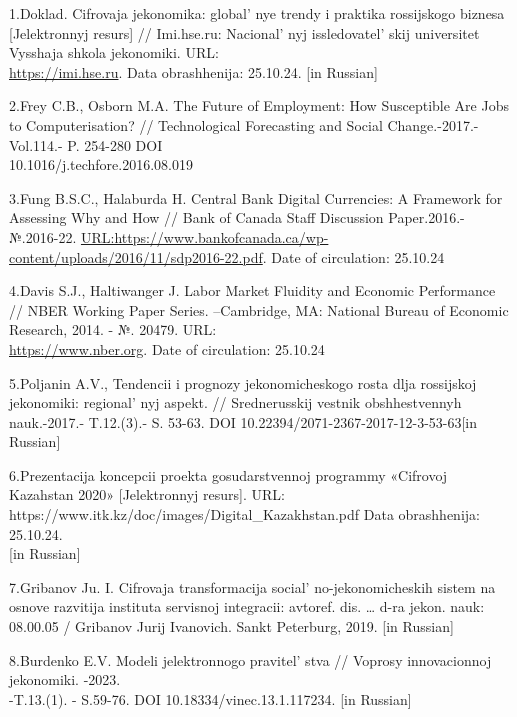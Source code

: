 \begin{references}
1.Doklad. Cifrovaja jekonomika: global' nye trendy i
praktika rossijskogo biznesa {[}Jelektronnyj resurs{]} // Imi.hse.ru:
Nacional' nyj issledovatel' skij
universitet Vysshaja shkola jekonomiki. URL:\\
\href{https://imi.hse.ru/pr2017\_1}{https://imi.hse.ru}. Data obrashhenija: 25.10.24. {[}in
Russian{]}

2.Frey C.B., Osborn M.A. The Future of Employment: How Susceptible Are
Jobs to Computerisation? // Technological Forecasting and Social
Change.-2017.-Vol.114.- P. 254-280 DOI \\10.1016/j.techfore.2016.08.019

3.Fung B.S.C., Halaburda H. Central Bank Digital Currencies: A Framework
for Assessing Why and How // Bank of Canada Staff Discussion
Paper.2016.-№.2016-22.
\href{https://www.bankofcanada.ca/wp-content/uploads/2016/11/sdp2016-22.pdf}{URL:https://www.bankofcanada.ca/wp-content/uploads/2016/11/sdp2016-22.pdf}.
Date of circulation: 25.10.24

4.Davis S.J., Haltiwanger J. Labor Market Fluidity and Economic
Performance // NBER Working Paper Series. --Cambridge, MA: National
Bureau of Economic Research, 2014. - №. 20479. URL:\\
\href{https://www.nber.org/system/files/working\_papers/w20479/w20479.pdf}{https://www.nber.org}.
Date of circulation: 25.10.24

5.Poljanin A.V., Tendencii i prognozy jekonomicheskogo rosta dlja
rossijskoj jekonomiki: regional' nyj aspekt. //
Srednerusskij vestnik obshhestvennyh nauk.-2017.- T.12.(3).- S. 53-63.
DOI 10.22394/2071-2367-2017-12-3-53-63{[}in Russian{]}

6.Prezentacija koncepcii proekta gosudarstvennoj programmy «Cifrovoj
Kazahstan 2020» {[}Jelektronnyj resurs{]}. URL:
https://www.itk.kz/doc/images/Digital\_Kazakhstan.pdf Data obrashhenija:
25.10.24. \\{[}in Russian{]}

7.Gribanov Ju. I. Cifrovaja transformacija
social' no-jekonomicheskih sistem na osnove razvitija
instituta servisnoj integracii: avtoref. dis. \ldots{} d-ra jekon. nauk:
08.00.05 / Gribanov Jurij Ivanovich. Sankt Peterburg, 2019. {[}in
Russian{]}

8.Burdenko E.V. Modeli jelektronnogo pravitel' stva //
Voprosy innovacionnoj jekonomiki. -2023. \\-T.13.(1). - S.59-76. DOI
10.18334/vinec.13.1.117234. {[}in Russian{]}


\end{references}

